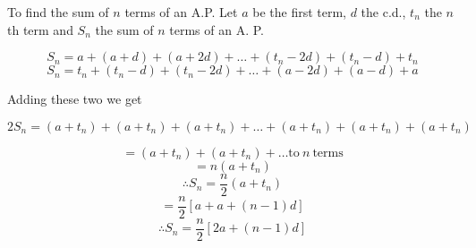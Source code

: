 \documentclass[aspectratio=1610,8pt]{beamer}
\begin{document}
\begin{frame}{To find the sum of $n$ terms of an A.P.}
  Let $a$ be the first term, $d$ the c.d., $t_n$ the $n$th term and $S_n$ the
  sum of $n$ terms of an A. P.

  $$S_n = a + (a + d) + (a + 2d) + \ldots + (t_n - 2d) + (t_n - d) + t_n$$
  $$S_n = t_n + (t_n - d) + (t_n - 2d)+ \ldots + (a - 2d) + (a - d) + a$$

  Adding these two we get

  $$2S_n = (a + t_n) + (a + t_n) + (a + t_n) + \ldots + (a + t_n) + (a + t_n) +
  (a + t_n)$$

  $$= (a + t_n) + (a + t_n) + \ldots \text{to}~n~\text{terms}$$
  $$= n(a + t_n)$$
  $$\therefore S_n = \frac{n}{2}(a + t_n)$$
  $$= \frac{n}{2}[a + a + (n - 1)d]$$
  $$\therefore S_n = \frac{n}{2}[2a + (n - 1)d]$$
\end{frame}
\end{document}
